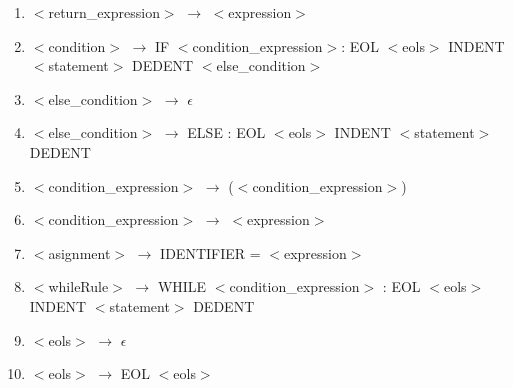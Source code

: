 \documentclass[12pt]{article}
\begin{document}
\begin{enumerate}
    \item $<$return\_expression$>$ $\rightarrow$ $<$expression$>$
    \item $<$condition$>$ $\rightarrow$ IF $<$condition\_expression$>$: EOL $<$eols$>$ INDENT $<$statement$>$ DEDENT $<$else\_condition$>$
    \item $<$else\_condition$>$ $\rightarrow$ $\epsilon$
    \item $<$else\_condition$>$ $\rightarrow$ ELSE : EOL $<$eols$>$ INDENT $<$statement$>$ DEDENT
    \item $<$condition\_expression$>$ $\rightarrow$ ($<$condition\_expression$>$)
    \item $<$condition\_expression$>$ $\rightarrow$ $<$expression$>$
    \item $<$asignment$>$ $\rightarrow$ IDENTIFIER = $<$expression$>$
    \item $<$whileRule$>$ $\rightarrow$ WHILE $<$condition\_expression$>$ : EOL $<$eols$>$ INDENT $<$statement$>$ DEDENT
    \item $<$eols$>$ $\rightarrow$ $\epsilon$
    \item $<$eols$>$ $\rightarrow$ EOL $<$eols$>$
\end{enumerate}
\end{document}
